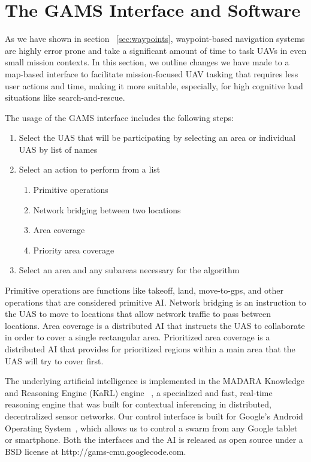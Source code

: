 \documentclass{sig-alternate-ipsn13}
\begin{document}
\section{The GAMS Interface and Software}
\label{sec:gamsinterface}

As we have shown in section ~\ref{sec:waypoints}, waypoint-based
navigation systems are highly error prone and take a significant amount
of time to task UAVs in even small mission contexts. In this section, we
outline changes we have made to a map-based interface to facilitate
mission-focused UAV tasking that requires less user actions and time,
making it more suitable, especially, for high cognitive load situations like
search-and-rescue.

The usage of the GAMS interface includes the following steps:
\begin{enumerate}
  \item Select the UAS that will be participating by selecting an area or individual UAS 
  by list of names
  \item Select an action to perform from a list
  \begin{enumerate}
    \item Primitive operations
    \item Network bridging between two locations
    \item Area coverage
    \item Priority area coverage
  \end{enumerate}
  \item Select an area and any subareas necessary for the algorithm
\end{enumerate}

Primitive operations are functions like takeoff, land, move-to-gps, and other
operations that are considered primitive AI. Network bridging is an instruction
to the UAS to move to locations that allow network traffic to pass between
locations. Area coverage is a distributed AI that instructs the UAS to collaborate
in order to cover a single rectangular area. Prioritized area coverage is a distributed AI
that provides for prioritized regions within a main area
that the UAS will try to cover first.

The underlying artificial intelligence is implemented in the MADARA Knowledge and
Reasoning Engine (KaRL) engine ~\cite{Edmondson-KaRL-ksem2011}, a specialized
and fast, real-time reasoning engine that was built for contextual inferencing in
distributed, decentralized sensor networks. Our control interface is built for Google's
Android Operating System~\cite{nimodia2012android}, which allows us to control a swarm from any Google
tablet or smartphone. Both the interfaces and the AI is released as open source under a BSD license
at http://gams-cmu.googlecode.com.
\end{document}
